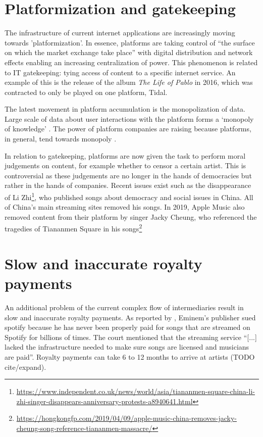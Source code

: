 \section{Platformization and gatekeeping}
The infrastructure of current internet applications are increasingly moving towards 'platformization'. In essence, platforms are taking control of ``the surface on which the market exchange take place'' \citep{andersson2016mastering} with digital distribution and network effects enabling an increasing centralization of power. This phenomenon is related to IT gatekeeping: tying access of content to a specific internet service. An example of this is the release of the album \textit{The Life of Pablo} in 2016, which was contracted to only be played on one platform, Tidal.

The latest movement in platform accumulation is the monopolization of data. Large scale of data about user interactions with the platform forms a `monopoly of knowledge' \citep{innis2007empire}. The power of platform companies are raising because platforms, in general, tend towards monopoly \citep{srnicek2017platform}. 

In relation to gatekeeping, platforms are now given the task to perform moral judgements on content, for example whether to censor a certain artist. This is controversial as these judgements are no longer in the hands of democracies but rather in the hands of companies. Recent issues exist such as the disappearance of Li Zhi\footnote{\url{https://www.independent.co.uk/news/world/asia/tiananmen-square-china-li-zhi-singer-disappears-anniversary-protests-a8940641.html}}, who published songs about democracy and social issues in China. All of China's main streaming sites removed his songs. In 2019, Apple Music also removed content from their platform by singer Jacky Cheung, who referenced the tragedies of Tiananmen Square in his songs\footnote{\url{https://hongkongfp.com/2019/04/09/apple-music-china-removes-jacky-cheung-song-reference-tiananmen-massacre/}}

\section{Slow and inaccurate royalty payments}
An additional problem of the current complex flow of intermediaries result in slow and inaccurate royalty payments. As reported by \cite{bbc2019}, Eminem's publisher sued spotify because he has never been properly paid for songs that are streamed on Spotify for billions of times. The court mentioned that the streaming service ``[...] lacked the infrastructure needed to make sure songs are licensed and musicians are paid''. Royalty payments can take 6 to 12 months to arrive at artists (TODO cite/expand). 

